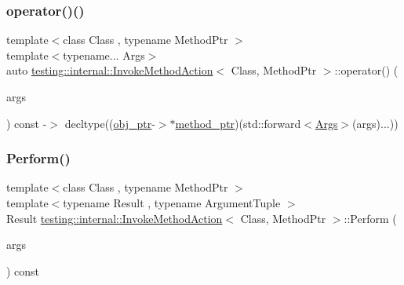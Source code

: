 \subsubsection{\texorpdfstring{operator()()}{operator()()}\hspace{0.1cm}{\footnotesize\ttfamily [2/2]}}
{\footnotesize\ttfamily template$<$class Class , typename Method\+Ptr $>$ \\
template$<$typename... Args$>$ \\
auto \mbox{\hyperlink{structtesting_1_1internal_1_1_invoke_method_action}{testing\+::internal\+::\+Invoke\+Method\+Action}}$<$ Class, Method\+Ptr $>$\+::operator() (\begin{DoxyParamCaption}\item[{\mbox{\hyperlink{namespacetesting_aaca153f67b689b8b9d5b8c67ecf8cee4}{Args}} \&\&...}]{args }\end{DoxyParamCaption}) const -\/$>$ decltype((\mbox{\hyperlink{structtesting_1_1internal_1_1_invoke_method_action_ae869b08a351641854e94380227affbc8}{obj\+\_\+ptr}}-\/$>$$\ast$\mbox{\hyperlink{structtesting_1_1internal_1_1_invoke_method_action_a3101d543f56f7d010fac4d8eaa03acfb}{method\+\_\+ptr}})(std\+::forward$<$\mbox{\hyperlink{namespacetesting_aaca153f67b689b8b9d5b8c67ecf8cee4}{Args}}$>$(args)...)) \hspace{0.3cm}{\ttfamily [inline]}}

\mbox{\label{structtesting_1_1internal_1_1_invoke_method_action_aed6971c668bc2c7671d512306b25b1ab}} 
\subsubsection{\texorpdfstring{Perform()}{Perform()}}
{\footnotesize\ttfamily template$<$class Class , typename Method\+Ptr $>$ \\
template$<$typename Result , typename Argument\+Tuple $>$ \\
Result \mbox{\hyperlink{structtesting_1_1internal_1_1_invoke_method_action}{testing\+::internal\+::\+Invoke\+Method\+Action}}$<$ Class, Method\+Ptr $>$\+::Perform (\begin{DoxyParamCaption}\item[{const Argument\+Tuple \&}]{args }\end{DoxyParamCaption}) const\hspace{0.3cm}{\ttfamily [inline]}}



